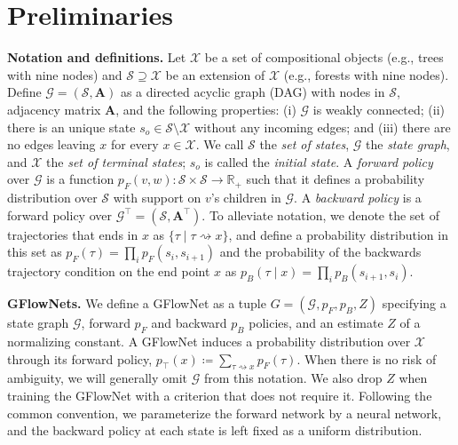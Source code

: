 \documentclass{article}
\newcommand{\pp}[1]{\vspace{0pt}\noindent\textbf{#1}}
\theoremstyle{plain}
\theoremstyle{definition}
\theoremstyle{remark}
\theoremstyle{remark}
\begin{document}

\section{Preliminaries} 
\label{sec:a}

\pp{Notation and definitions.}
Let $\mathcal{X}$ be a set of compositional objects (e.g., trees with nine nodes) and $\mathcal{S} \supseteq \mathcal{X}$ be an extension of $\mathcal{X}$ (e.g., forests with nine nodes).
Define $\mathcal{G} = (\mathcal{S}, \mathbf{A})$ as a directed acyclic graph (DAG) with nodes in $\mathcal{S}$, adjacency matrix $\mathbf{A}$, and the following properties: (i) $\mathcal{G}$ is weakly connected; (ii) there is an unique state $s_{o} \in \mathcal{S} \setminus \mathcal{X}$ without any incoming edges; and (iii) there are no edges leaving $x$ for every $x \in \mathcal{X}$.
We call $\mathcal{S}$ the \textit{set of states}, $\mathcal{G}$ the \textit{state graph}, and $\mathcal{X}$ the \textit{set of terminal states}; $s_{o}$ is called the \textit{initial state}. 
A \textit{forward policy} over $\mathcal{G}$ is a function $p_{F}(v,w) \colon \mathcal{S} \times \mathcal{S} \rightarrow \mathbb{R}_{+}$ such that it defines a probability distribution over $\mathcal{S}$ with support on $v$'s children in $\mathcal{G}$.
A \textit{backward policy} is a forward policy over $\mathcal{G}^{\intercal} = (\mathcal{S}, \mathbf{A}^{\intercal})$.
To alleviate notation, we denote the set of trajectories that ends in $x$ as $\{\tau\mid\tau\rightsquigarrow x\}$, and define a probability distribution in this set as $p_F(\tau) = \prod_i p_F(s_i, s_{i+1})$ and the probability of the backwards trajectory condition on the end point $x$ as $p_B(\tau\mid x) = \prod_i p_B(s_{i+1}, s_i)$.

\pp{GFlowNets.} \label{p:gflownets}
We define a GFlowNet as a tuple $G = (\mathcal{G}, p_{F}, p_{B}, Z)$ specifying a state graph $\mathcal{G}$, forward $p_{F}$ and backward $p_{B}$ policies, and an estimate $Z$ of a normalizing constant. A GFlowNet induces a probability distribution over $\mathcal{X}$ through its forward policy, $p_{\top}(x) \coloneq \sum_{\tau \rightsquigarrow x} p_{F}(\tau)$.
When there is no risk of ambiguity, we will generally omit $\mathcal{G}$ from this notation. We also drop $Z$ when training the GFlowNet with a criterion that does not require it.
Following the common convention, we parameterize the forward network by a neural network, and the backward policy at each state is left fixed as a uniform distribution. 
\end{document}
